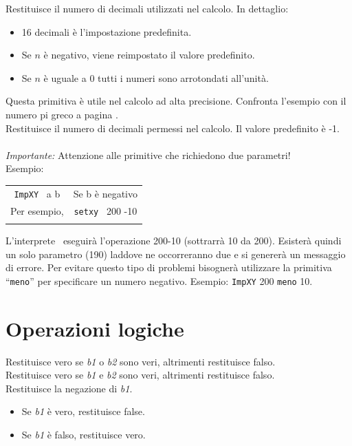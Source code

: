  Restituisce il numero di decimali utilizzati nel calcolo. In dettaglio:\\
\begin{itemize}
 \item 16 decimali è l'impostazione predefinita.
 \item Se $n$ è negativo, viene reimpostato il valore predefinito. 
 \item Se $n$ è uguale a 0 tutti i numeri sono arrotondati all'unità.
\end{itemize}
Questa primitiva è utile nel calcolo ad alta precisione. Confronta l'esempio con il numero pi greco a pagina \pageref{approx-pi}.\\
 Restituisce il numero di decimali permessi nel calcolo. Il valore predefinito è -1.\\ \\
\emph{Importante:} Attenzione alle primitive che richiedono due parametri! \\
Esempio: \begin{tabular}{cc}
 \texttt{ImpXY} \ a b &
 Se b è negativo\\
 Per esempio, &
 \texttt{setxy} \ 200 -10\\
\\
\end{tabular}

L'interprete \logo\ eseguirà l'operazione 200-10 (sottrarrà 10 da 200). Esisterà quindi un solo parametro (190) laddove ne occorreranno due e si genererà un messaggio di errore. Per evitare questo tipo di problemi bisognerà utilizzare la primitiva {}``\texttt{meno}'' per specificare un numero negativo. Esempio: \texttt{ImpXY} 200 \texttt{meno} 10.\\


\section{Operazioni logiche}
Restituisce vero se \textit{b1} o \textit{b2} sono veri, altrimenti restituisce falso.\\
Restituisce vero se \textit{b1} e \textit{b2} sono veri, altrimenti restituisce falso.\\
Restituisce la negazione di \textit{b1}.
\begin{itemize}
 \item  Se \textit{b1} è vero, restituisce false.
 \item  Se \textit{b1} è falso, restituisce vero.
\end{itemize}


